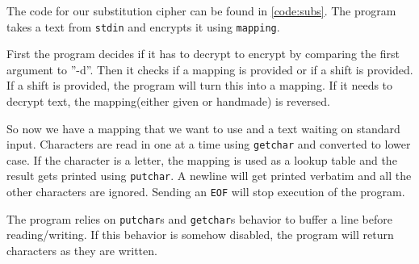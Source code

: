 The code for our substitution cipher can be found in \autoref{code:subs}. The program takes a text from \lstinline{stdin} and encrypts it using \lstinline{mapping}.

First the program decides if it has to decrypt to encrypt by comparing the first argument to ''-d''. Then it checks if a mapping is provided or if a shift is provided. If a shift is provided, the program will turn this into a mapping. If it needs to decrypt text, the mapping(either given or handmade) is reversed. 

So now we have a mapping that we want to use and a text waiting on standard input. Characters are read in one at a time using \lstinline{getchar} and converted to lower case. If the character is a letter, the mapping is used as a lookup table and the result gets printed using \lstinline{putchar}. A newline will get printed verbatim and all the other characters are ignored. Sending an \lstinline{EOF} will stop execution of the program.

The program relies on \lstinline{putchar}s and \lstinline{getchar}s behavior to buffer a line before reading/writing. If this behavior is somehow disabled, the program will return characters as they are written.


